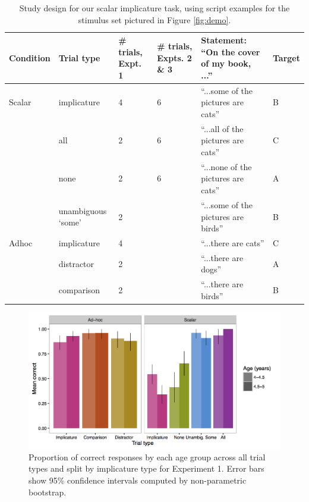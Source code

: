 \documentclass[man]{apa2}
\begin{document}
 \begin{table}
 \footnotesize
 \centering
     \begin{tabular}{C{1.5cm} C{2cm} C{1.5cm} C{1.5cm} C{4.5cm} C{1.5cm}}
                      \hline
       \null   Condition  & Trial type & \# trials, Expt. 1 & \# trials, Expts. 2 \& 3 & Statement: ``On the cover of my book, ...'' & Target   \\
       \hline
            Scalar & implicature & 4 & 6 &  ``...some of the pictures are cats'' & B	 \\
          & all  & 2 &  6 & ``...all of the pictures are cats'' & C		                 \\
           & none  & 2 & 6 & ``...none of the pictures are cats'' & A			\\
               & unambiguous `some' 	&  2 &  & ``...some of the pictures are birds'' & B					        \\
	\hline
	    Adhoc       & implicature & 4 &  & ``...there are cats'' & C 		\\
	     & distractor & 2 &  & ``...there are dogs'' & A	     \\
          & comparison & 2 &  & ``...there are birds'' & B 	   \\
       \hline
     \end{tabular}
     \caption{Study design for our scalar implicature task, using script examples for the stimulus set pictured in Figure \ref{fig:demo}. \label{tab:scripts} }
 \end{table}

 \begin{figure}
 \begin{center}
  \includegraphics[width=4.5in]{figures/exp1_performance.png}
  \caption{\label{fig:exp1_perf} Proportion of correct responses by each age group across all trial types and split by implicature type for Experiment 1. Error bars show 95\% confidence intervals computed by non-parametric bootstrap.}
 \end{center}
\end{figure}
\end{document}
